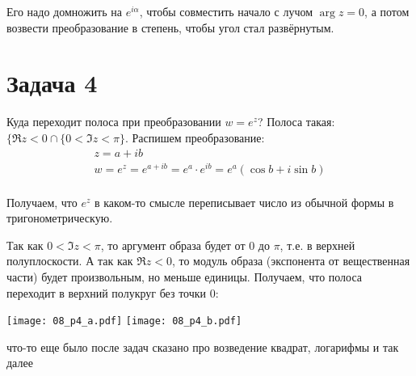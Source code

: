 	Его надо домножить на $e^{i\alpha}$, чтобы совместить начало с лучом $\arg z = 0$,
	а потом возвести преобразование в степень, чтобы угол стал развёрнутым.

\section{Задача 4}
	Куда переходит полоса при преобразовании $w=e^z$?
	Полоса такая: $\{ \Re z < 0 \cap \{ 0 < \Im z < \pi\}$.
	Распишем преобразование: 
	\begin{gather*}
		z = a + ib \\
		w=e^z=e^{a+ib}=e^a\cdot e^{ib} = e^a (\cos b + i\sin b)\\
	\end{gather*}
	\begin{center}
	\end{center}
	Получаем, что $e^z$ в каком-то смысле переписывает число из обычной формы в тригонометрическую.

	Так как $0 < \Im z < \pi$, то аргумент образа будет от $0$ до $\pi$, т.е. в верхней полуплоскости.
	А так как $\Re z < 0$, то модуль образа (экспонента от вещественная части) будет произвольным, но меньше единицы.
	Получаем, что полоса переходит в верхний полукруг без точки 0:
	\begin{center}
		\texttt{[image: 08\_p4\_a.pdf]} \quad \texttt{[image: 08\_p4\_b.pdf]}
	\end{center}

\TODO что-то еще было после задач сказано про возведение квадрат, логарифмы и так далее
